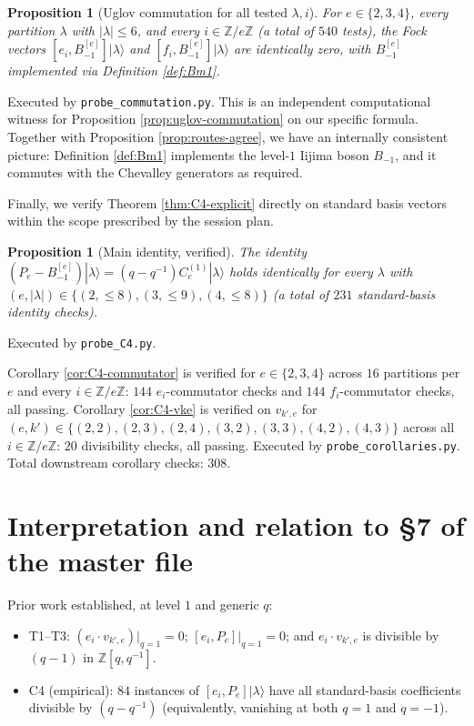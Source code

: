 \documentclass[11pt]{article}
\newtheorem{proposition}[theorem]{Proposition}
\theoremstyle{definition}
\newcommand{\vke}{v_{k',e}}
\newcommand{\Ce}{C_e^{(1)}}
\newcommand{\Bmi}{B_{-1}^{[e]}}
\begin{document}
\begin{proposition}[Uglov commutation for all tested $\lambda, i$]
\label{prop:uglov-comm-check}
For $e \in \{2, 3, 4\}$, every partition $\lambda$ with $|\lambda| \le 6$, and
every $i \in \mathbb Z/e\mathbb Z$ (a total of $540$ tests), the Fock vectors
$[e_i, \Bmi] |\lambda\rangle$ and $[f_i, \Bmi] |\lambda\rangle$ are identically
zero, with $\Bmi$ implemented via Definition \ref{def:Bm1}.
\end{proposition}

Executed by \texttt{probe\_commutation.py}. This is an independent computational
witness for Proposition \ref{prop:uglov-commutation} on our specific formula.
Together with Proposition \ref{prop:routes-agree}, we have an internally
consistent picture: Definition \ref{def:Bm1} implements the level-$1$ Iijima
boson $B_{-1}$, and it commutes with the Chevalley generators as required.

Finally, we verify Theorem \ref{thm:C4-explicit} directly on standard basis
vectors within the scope prescribed by the session plan.

\begin{proposition}[Main identity, verified]
\label{prop:main-identity-verified}
The identity $(P_e - \Bmi) |\lambda\rangle = (q - q^{-1}) \Ce |\lambda\rangle$
holds identically for every $\lambda$ with $(e, |\lambda|) \in \{(2, \le 8), (3, \le 9), (4, \le 8)\}$
(a total of $231$ standard-basis identity checks).
\end{proposition}

Executed by \texttt{probe\_C4.py}.

Corollary \ref{cor:C4-commutator} is verified for $e \in \{2, 3, 4\}$ across
$16$ partitions per $e$ and every $i \in \mathbb Z/e\mathbb Z$: $144$
$e_i$-commutator checks and $144$ $f_i$-commutator checks, all passing.
Corollary \ref{cor:C4-vke} is verified on $\vke$ for
$(e, k') \in \{(2,2), (2,3), (2,4), (3,2), (3,3), (4,2), (4,3)\}$ across all
$i \in \mathbb Z/e\mathbb Z$: $20$ divisibility checks, all passing. Executed
by \texttt{probe\_corollaries.py}. Total downstream corollary checks: $308$.

\section{Interpretation and relation to \S 7 of the master file}
\label{sec:interpretation}

Prior work \cite{Clio-commutation-defect-2026-08-12} established, at level $1$
and generic $q$:
\begin{itemize}
    \item T1--T3: $(e_i \cdot \vke)|_{q=1} = 0$; $[e_i, P_e]|_{q=1} = 0$; and
    $e_i \cdot \vke$ is divisible by $(q - 1)$ in $\mathbb Z[q, q^{-1}]$.
    \item C4 (empirical): $84$ instances of $[e_i, P_e] |\lambda\rangle$
    have all standard-basis coefficients divisible by $(q - q^{-1})$
    (equivalently, vanishing at both $q = 1$ and $q = -1$).
\end{itemize}
\end{document}
